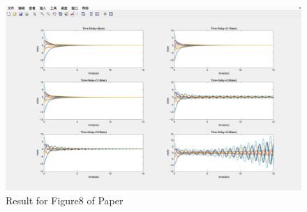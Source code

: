 \documentclass{article}
\begin{document}
\begin{figure}[htbp]
    \centering
    \includegraphics[width=14.5cm]{figures/UserFig83.png}
    \caption{Result for Figure8 of Paper}
    \label{UserFig5}
\end{figure}
\end{document}
